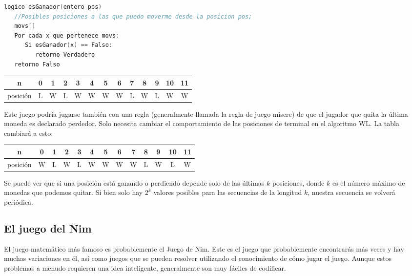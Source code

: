 \begin{lstlisting}[language=C++]
logico esGanador(entero pos)
   //Posibles posiciones a las que puedo moverme desde la posicion pos;
   movs[]
   Por cada x que pertenece movs: 
      Si esGanador(x) == Falso: 
         retorno Verdadero
   retorno Falso
\end{lstlisting}

\begin{tabular}{|c|c|c|c|c|c|c|c|c|c|c|c|c|}
	\hline 
	n & 0 & 1 & 2 & 3 & 4 & 5 & 6 & 7 & 8 & 9 & 10 & 11 \\ 
	\hline 
	posición & L & W & L & W & W & W & W & L & W & L & W & W \\ 
	\hline 
	
\end{tabular} 

\vspace{0.5in}

Este juego podría jugarse también con una regla (generalmente llamada la regla de juego misere) de que el jugador que quita la última moneda es declarado perdedor. Solo necesita cambiar el comportamiento de las posiciones de terminal en el algoritmo WL. La tabla  cambiará a esto:


\begin{tabular}{|c|c|c|c|c|c|c|c|c|c|c|c|c|}
	\hline 
	n & 0 & 1 & 2 & 3 & 4 & 5 & 6 & 7 & 8 & 9 & 10 & 11 \\ 
	\hline 
	posición & W & L & W & L & W & W & W & W & L & W & L & W  \\ 
	\hline 
	
\end{tabular}
\vspace{0.5in}

Se puede ver que si una posición está ganando o perdiendo depende solo de las últimas $k$ posiciones, donde $k$ es el número máximo de monedas que podemos quitar. Si bien solo hay $2^{k}$ valores posibles para las secuencias de la longitud $k$, nuestra secuencia se volverá periódica.

\subsection{El juego del Nim}

El juego matemático más famoso es probablemente el Juego de Nim. Este es el juego que probablemente encontrarás más veces y hay muchas variaciones en él, así como juegos que se pueden resolver utilizando el conocimiento de cómo jugar el juego. Aunque estos problemas a menudo requieren una idea inteligente, generalmente son muy fáciles de codificar.

